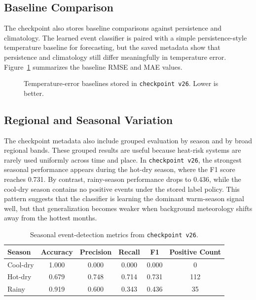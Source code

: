 \documentclass[12pt,a4paper]{article}
\begin{document}
\subsection{Baseline Comparison}
The checkpoint also stores baseline comparisons against persistence and climatology. The learned event classifier is paired with a simple persistence-style temperature baseline for forecasting, but the saved metadata show that persistence and climatology still differ meaningfully in temperature error. Figure~\ref{fig:baseline} summarizes the baseline RMSE and MAE values.

\begin{figure}[H]
\centering
{}
\caption{Temperature-error baselines stored in \texttt{checkpoint v26}. Lower is better.}
\label{fig:baseline}
\end{figure}

\subsection{Regional and Seasonal Variation}
The checkpoint metadata also include grouped evaluation by season and by broad regional bands. These grouped results are useful because heat-risk systems are rarely used uniformly across time and place. In \texttt{checkpoint v26}, the strongest seasonal performance appears during the hot-dry season, where the F1 score reaches 0.731. By contrast, rainy-season performance drops to 0.436, while the cool-dry season contains no positive events under the stored label policy. This pattern suggests that the classifier is learning the dominant warm-season signal well, but that generalization becomes weaker when background meteorology shifts away from the hottest months.

\begin{table}[H]
\centering
\caption{Seasonal event-detection metrics from \texttt{checkpoint v26}.}
\label{tab:seasonal}
\begin{tabular}{lccccc}
\toprule
Season & Accuracy & Precision & Recall & F1 & Positive Count \\
\midrule
Cool-dry & 1.000 & 0.000 & 0.000 & 0.000 & 0 \\
Hot-dry & 0.679 & 0.748 & 0.714 & 0.731 & 112 \\
Rainy & 0.919 & 0.600 & 0.343 & 0.436 & 35 \\
\bottomrule
\end{tabular}
\end{table}
\end{document}
